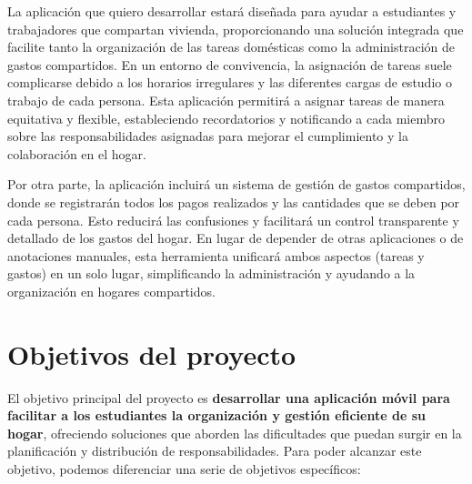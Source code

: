 La aplicación que quiero desarrollar estará diseñada para ayudar a estudiantes y trabajadores que compartan vivienda,
proporcionando una solución integrada que facilite tanto la organización de las tareas domésticas como la administración de gastos compartidos.
En un entorno de convivencia, la asignación de tareas suele complicarse debido a los horarios irregulares y las diferentes cargas de estudio o trabajo de cada persona.
Esta aplicación permitirá a asignar tareas de manera equitativa y flexible, estableciendo recordatorios y notificando a cada miembro sobre las responsabilidades
asignadas para mejorar el cumplimiento y la colaboración en el hogar. 

Por otra parte, la aplicación incluirá un sistema de gestión de gastos compartidos, donde se registrarán todos los pagos realizados
y las cantidades que se deben por cada persona. Esto reducirá las confusiones y facilitará un control transparente y detallado de los 
gastos del hogar. En lugar de depender de otras aplicaciones o de anotaciones manuales, esta herramienta unificará ambos aspectos (tareas y gastos) 
en un solo lugar, simplificando la administración y ayudando a la organización en hogares compartidos. 

\section{Objetivos del proyecto}
\label{sec:objetivos}

El objetivo principal del proyecto es \textbf{desarrollar una aplicación móvil para facilitar a los estudiantes la organización y gestión eficiente de su hogar}, ofreciendo soluciones que aborden las dificultades 
que puedan surgir en la planificación y distribución de responsabilidades. Para poder alcanzar este objetivo, podemos diferenciar una serie de objetivos específicos:

